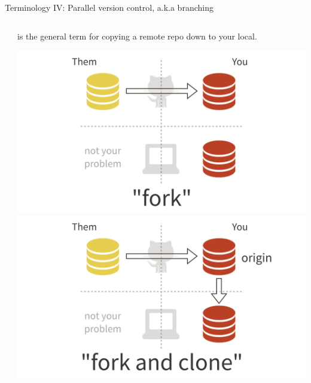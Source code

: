\documentclass[ignorenonframetext, 10pt, aspectratio=169]{beamer}
\begin{document}
\begin{frame}{Terminology IV: Parallel version control, a.k.a branching}
\begin{columns}[T]
\begin{column}{0.25\textwidth}
\end{column}

\begin{column}{0.25\textwidth}
is the general term for copying a remote repo down to your local.\\

\smallskip

\includegraphics[width = 1.25\linewidth]{fork.png}\\

\includegraphics[width = 1.25\linewidth]{fork-and-clone.png}
\end{column}

\end{columns}
\end{frame}

\end{document}
